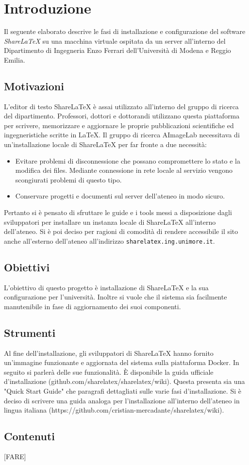 \chapter{Introduzione}
\label{Introduzione}
\thispagestyle{empty}

Il seguente elaborato descrive le fasi di installazione e configurazione del software \emph{ShareLaTeX} su una macchina virtuale ospitata da un server all'interno del Dipartimento di Ingegneria Enzo Ferrari dell'Università di Modena e Reggio Emilia.

\section{Motivazioni}
L'editor di testo ShareLaTeX è assai utilizzato all'interno del gruppo di ricerca del dipartimento. Professori, dottori e dottorandi utilizzano questa piattaforma per scrivere, memorizzare e aggiornare le proprie pubblicazioni scientifiche ed ingegneristiche scritte in \LaTeX. Il gruppo di ricerca AImageLab necessitava di un'installazione locale di ShareLaTeX per far fronte a due necessità:
\begin{itemize}
    \item Evitare problemi di disconnessione che possano compromettere lo stato e la modifica dei files. Mediante connessione in rete locale al servizio vengono scongiurati problemi di questo tipo.
    \item Conservare progetti e documenti sul server dell'ateneo in modo sicuro.
\end{itemize}
Pertanto si è pensato di sfruttare le guide e i tools messi a disposizione dagli sviluppatori per installare un instanza locale di ShareLaTeX all'interno dell'ateneo. Si è poi deciso per ragioni di comodità di rendere accessibile il sito anche all'esterno dell'ateneo all'indirizzo \verb|sharelatex.ing.unimore.it|.

\section{Obiettivi}
L'obiettivo di questo progetto è installazione di ShareLaTeX e la sua configurazione per l'università. Inoltre si vuole che il sistema sia facilmente manutenibile in fase di aggiornamento dei suoi componenti.

\section{Strumenti}
Al fine dell'installazione, gli sviluppatori di ShareLaTeX hanno fornito un'immagine funzionante e aggiornata del sistema sulla piattaforma Docker. In seguito si parlerà delle sue funzionalità. È disponibile la guida ufficiale d'installazione (github.com/sharelatex/sharelatex/wiki). Questa presenta sia una "Quick Start Guide" che paragrafi dettagliati sulle varie fasi d'installazione. Si è deciso di scrivere una guida analoga per l'installazione all'interno dell'ateneo in lingua italiana (https://github.com/cristian-mercadante/sharelatex/wiki).

\section{Contenuti}
\huge [FARE]
\normalsize

